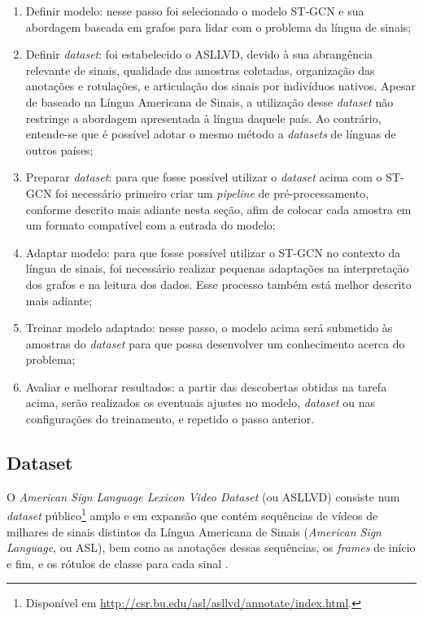 \begin{enumerate}
    \item Definir modelo: nesse passo foi selecionado o modelo ST-GCN e sua abordagem baseada em grafos para lidar com o problema da língua de sinais;
    \item Definir \textit{dataset}: foi estabelecido o ASLLVD, devido à sua abrangência relevante de sinais, qualidade das amostras coletadas, organização das anotações e rotulações, e articulação dos sinais por indivíduos nativos. Apesar de baseado na Língua Americana de Sinais, a utilização desse \textit{dataset} não restringe a abordagem apresentada à língua daquele país. Ao contrário, entende-se que é possível adotar o mesmo método a \textit{datasets} de línguas de outros países;
    \item Preparar \textit{dataset}: para que fosse possível utilizar o \textit{dataset} acima com o ST-GCN foi necessário primeiro criar um \textit{pipeline} de pré-processamento, conforme descrito mais adiante nesta seção, afim de colocar cada amostra em  um formato compatível com a entrada do modelo;
    \item Adaptar modelo: para que fosse possível utilizar o ST-GCN no contexto da língua de sinais, foi necessário realizar pequenas adaptações na interpretação dos grafos e na leitura dos dados. Esse processo também está melhor descrito mais adiante;
    \item Treinar modelo adaptado: nesse passo, o modelo acima será submetido às amostras do \textit{dataset} para que possa desenvolver um conhecimento acerca do problema;
    \item Avaliar e melhorar resultados: a partir das descobertas obtidas na tarefa acima, serão realizados os eventuais ajustes no modelo, \textit{dataset} ou nas configurações do treinamento, e repetido o passo anterior.
\end{enumerate}


\subsection{Dataset} %

O \textit{American Sign Language Lexicon Video Dataset} (ou ASLLVD) consiste num \textit{dataset} público\footnote{
    Disponível em \url{http://csr.bu.edu/asl/asllvd/annotate/index.html}.
} amplo e em expansão que contém sequências de vídeos de milhares de sinais distintos da Língua Americana de Sinais (\textit{American Sign Language}, ou ASL), bem como as anotações dessas sequências, os \textit{frames} de início e fim, e os rótulos de classe para cada sinal \cite{athitsos-asllvd-2008, neidle-2012, vloger-2012}.

